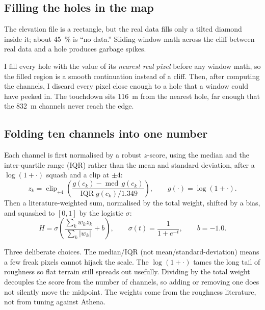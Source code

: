 \documentclass[11pt]{article}
\begin{document}
\subsection{Filling the holes in the map}
The elevation file is a rectangle, but the real data fills only a tilted diamond
inside it; about \SI{45}{\percent} is ``no data.'' Sliding-window math across the
cliff between real data and a hole produces garbage spikes.

\begin{intentbox}
I fill every hole with the value of its \emph{nearest real pixel} before any window
math, so the filled region is a smooth continuation instead of a cliff. Then, after
computing the channels, I discard every pixel close enough to a hole that a window
could have peeked in. The touchdown sits \SI{116}{\meter} from the nearest hole, far
enough that the 8\textendash\SI{32}{\meter} channels never reach the edge.
\end{intentbox}

\subsection{Folding ten channels into one number}
Each channel is first normalised by a robust $z$-score, using the median and the
inter-quartile range (IQR) rather than the mean and standard deviation, after a
$\log(1+\cdot)$ squash and a clip at $\pm 4$:
\begin{equation}
z_k=\operatorname{clip}_{\pm4}\!\left(\frac{g(c_k)-\operatorname{med}\,g(c_k)}{\operatorname{IQR}g(c_k)/1.349}\right),\qquad g(\cdot)=\log(1+\cdot).
\label{eq:z}
\end{equation}
Then a literature-weighted sum, normalised by the total weight, shifted by a bias,
and squashed to $[0,1]$ by the logistic $\sigma$:
\begin{equation}
H=\sigma\!\left(\frac{\sum_k w_k z_k}{\sum_k |w_k|}+b\right),\qquad
\sigma(t)=\frac{1}{1+e^{-t}},\qquad b=-1.0 .
\label{eq:fuse}
\end{equation}

\begin{intentbox}
Three deliberate choices. The median/IQR (not mean/standard-deviation) means a few
freak pixels cannot hijack the scale. The $\log(1+\cdot)$ tames the long tail of
roughness so flat terrain still spreads out usefully. Dividing by the total weight
decouples the score from the number of channels, so adding or removing one does not
silently move the midpoint. The weights come from the roughness literature, not from
tuning against Athena.
\end{intentbox}
\end{document}
